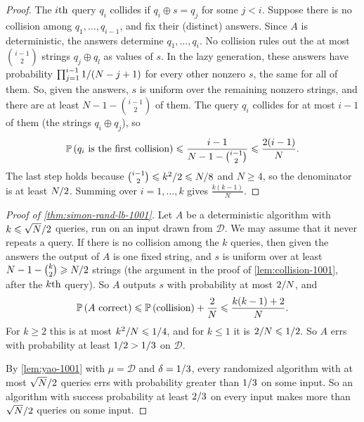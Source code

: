 \begin{proof}
    The $i\text{th}$ query $q_i$ collides if $q_i \oplus s = q_j$ for some $j < i$. Suppose there is no
    collision among $q_1, \dots, q_{i-1}$, and fix their (distinct) answers. Since $A$ is
    deterministic, the answers determine $q_1, \dots, q_i$. No collision rules out the at most
    $\binom{i-1}{2}$ strings $q_j \oplus q_l$ as values of $s$. In the lazy generation, these answers
    have probability $\prod_{j=1}^{i-1} 1/(N-j+1)$ for every other nonzero $s$, the same for
    all of them. So, given the answers, $s$ is uniform over the remaining nonzero strings, and there
    are at least $N - 1 - \binom{i-1}{2}$ of them. The query $q_i$ collides for at most $i - 1$ of
    them (the strings $q_i \oplus q_j$), so
    \[\prob{q_i \text{ is the first collision}} \leq \frac{i-1}{N - 1 - \binom{i-1}{2}} \leq \frac{2(i-1)}{N}.\]
    The last step holds because $\binom{i-1}{2} \leqslant k^2/2 \leqslant N/8$ and $N \geq 4$,
    so the denominator is at least $N/2$. Summing over $i = 1, \dots, k$ gives
    $\frac{k(k-1)}{N}$.
\end{proof}

\begin{proof}[Proof of \cref{thm:simon-rand-lb-1001}]
    Let $A$ be a deterministic algorithm with $k \leqslant \sqrt{N}/2$ queries, run on an input
    drawn from $\mathcal{D}$. We may assume that it never repeats a query. If there is no collision
    among the $k$ queries, then given the answers the output of $A$ is one fixed string, and $s$ is
    uniform over at least $N - 1 - \binom{k}{2} \geqslant N/2$ strings (the argument in the proof
    of \cref{lem:collision-1001}, after the $k\text{th}$ query). So $A$ outputs $s$ with probability at
    most $2/N$, and
    \[\prob{A \text{ correct}} \leq \prob{\text{collision}} + \frac{2}{N} \leq \frac{k(k-1) + 2}{N}.\]
    For $k \geq 2$ this is at most $k^2/N \leqslant 1/4$, and for $k \leq 1$ it is
    $2/N \leqslant 1/2$. So $A$ errs with probability at least
    $1/2 > 1/3$ on $\mathcal{D}$.

    By \cref{lem:yao-1001} with $\mu = \mathcal{D}$ and $\delta = 1/3$, every randomized
    algorithm with at most $\sqrt{N}/2$ queries errs with probability greater than
    $1/3$ on some input. So an algorithm with success probability at least $2/3$
    on every input makes more than $\sqrt{N}/2$ queries on some input.
\end{proof}

